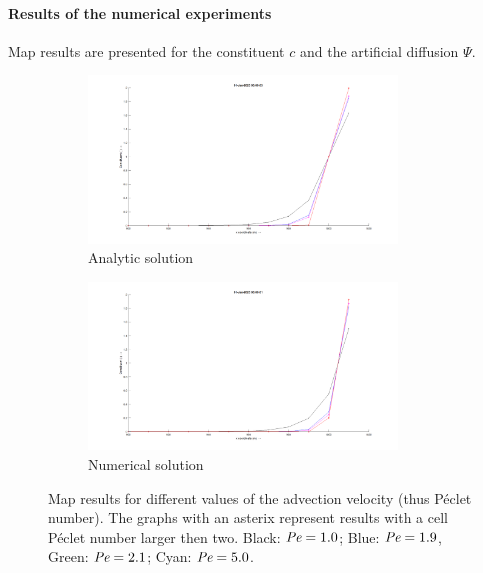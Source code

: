 \paragraph*{Results of the numerical experiments}
Map results are presented for the constituent $c$ and the artificial diffusion $\Psi$.
\begin{figure}[H]
    \begin{subfigure}{0.5\textwidth}
    \centering
    \includegraphics[width=0.9\textwidth]{figures/analytic_boundary_layer.png}
    \caption{Analytic solution}
    \end{subfigure}
    \begin{subfigure}{0.5\textwidth}
    \centering
    \includegraphics[width=0.9\textwidth]{figures/adv_diff_constituent.png}
    \caption{Numerical solution}
    \end{subfigure}
    \caption{Map results for different values of the advection velocity (thus P\'eclet number). The graphs with an  asterix represent results with a cell P\'eclet number larger then two. Black: $\textit{Pe} = 1.0$; Blue: $\textit{Pe} = 1.9$, Green: $\textit{Pe} = 2.1$; Cyan: $\textit{Pe} = 5.0$.}
\end{figure}
